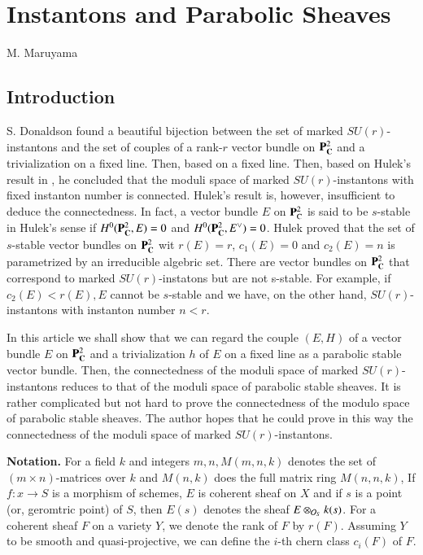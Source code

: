 \chapter{Instantons and Parabolic Sheaves}\label{chap12}


\begin{center}
M. Maruyama
\end{center}

\section*{Introduction}

\setcounter{pageoriginal}{244}
S. Donaldson\pageoriginale  \cite{chap12-key1} found a beautiful bijection between the set of marked $SU(r)$-instantons and the set of couples of a rank-$r$  vector bundle on $\mathbf{P}_{\mathbf{C}}^{2}$ and a trivialization on a fixed line. Then, based on a fixed line. Then, based on Hulek's result in \cite{chap12-key3}, he concluded that the moduli space of marked $SU(r)$-instantons with fixed instanton number is connected. Hulek's result is, however, insufficient to deduce the connectedness. In fact, a vector bundle $E$ on $\mathbf{P}_{\operatorname{C}}^{2}$ is said to be $s$-stable in Hulek's sense if $H^{0}(\mathbf{P}_{\mathbf{C}}^{2}, E) =0$ and $H^{0}(\mathbf{P}_{\mathbf{C}}^{2}, E^{\vee}) =0$. Hulek \cite{chap12-key3} proved that the set of $s$-stable vector bundles on $\mathbf{P}_{\mathbf{C}}^{2}$ wit $r(E) =r$, $c_{1}(E)=0$ and $c_{2}(E)=n$ is parametrized by an irreducible algebric set. There are vector bundles on $\mathbf{P}_{\mathbf{C}}^{2}$ that correspond to marked $SU(r)$-instatons but are not s-stable. For example, if $c_{2}(E) < r(E), E$ cannot be $s$-stable and we have, on the other hand, $SU(r)$-instantons with instanton number $n< r$.

In this article we shall show that we can regard the couple $(E,H)$ of  a vector bundle $E$ on $\mathbf{P}_{\mathbf{C}}^{2}$ and a trivialization $h$ of $E$ on a fixed line as a parabolic stable vector bundle. Then, the connectedness of the moduli space of marked $SU(r)$-instantons reduces to that of the moduli space of parabolic stable sheaves. It is rather complicated but not hard to prove the connectedness of the modulo space of parabolic stable sheaves. The author hopes that he could prove in this way the connectedness of the moduli space of marked $SU(r)$-instantons.

\medskip
\noindent
{\bfseries Notation.} For a field $k$ and integers $m,n, M(m,n,k)$ denotes the set of $(m \times n)$-matrices over $k$ and $M(n,k)$ does the full matrix ring $M(n,n,k)$, If $f : x \rightarrow S$ is a morphism of schemes, $E$ is coherent sheaf on $X$ and if  $s$ is a point (or, geromtric point) of $S$, then $E(s)$ denotes the sheaf $E\otimes_{\mathcal{O}_{S}} k(s)$. For a coherent sheaf $F$ on a variety $Y$, we denote the rank of $F$ by $r(F)$. Assuming $Y$ to be smooth and quasi-projective, we can define the $i$-th chern class $c_{i}(F)$ of $F$.

